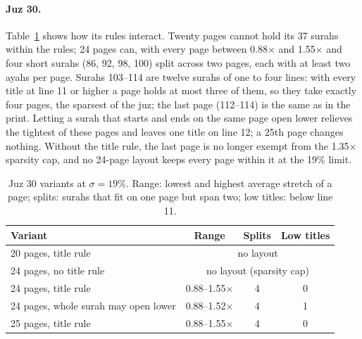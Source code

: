 \documentclass[sigconf,nonacm]{acmart}
\newcommand{\x}{\ensuremath{\times}}
\begin{document}
\paragraph{Juz 30.} Table~\ref{tab:juz30} shows how its rules interact. Twenty pages cannot hold its 37 surahs within the rules; 24 pages can, with every page between 0.88\x{} and 1.55\x{} and four short surahs (86, 92, 98, 100) split across two pages, each with at least two ayahs per page. Surahs 103--114 are twelve surahs of one to four lines: with every title at line 11 or higher a page holds at most three of them, so they take exactly four pages, the sparsest of the juz; the last page (112--114) is the same as in the print. Letting a surah that starts and ends on the same page open lower relieves the tightest of these pages and leaves one title on line 12; a 25th page changes nothing. Without the title rule, the last page is no longer exempt from the 1.35\x{} sparsity cap, and no 24-page layout keeps every page within it at the 19\% limit.

\begin{table}[t]
  \centering\small
  \caption{Juz 30 variants at $\sigma=19\%$. Range: lowest and highest average stretch of a page; splits: surahs that fit on one page but span two; low titles: below line 11.}
  \label{tab:juz30}
  \begin{tabularx}{\linewidth}{@{}Xccc@{}}
    \toprule
    Variant & Range & Splits & Low titles \\
    \midrule
    20 pages, title rule & \multicolumn{3}{c}{no layout} \\
    24 pages, no title rule & \multicolumn{3}{c}{no layout (sparsity cap)} \\
    \rowcolor{nazm!10} 24 pages, title rule & 0.88--1.55\x & 4 & 0 \\
    24 pages, whole surah may open lower & 0.88--1.52\x & 4 & 1 \\
    25 pages, title rule & 0.88--1.55\x & 4 & 0 \\
    \bottomrule
  \end{tabularx}
\end{table}
\end{document}
